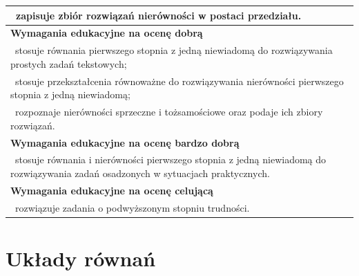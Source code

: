 \documentclass[12pt,a4paper]{article}
\begin{document}
\begin{longtable}{|p{16cm}|}
		\textbullet\ zapisuje zbiór rozwiązań nierówności w postaci przedziału. \\ \hline
		
		\textbf{Wymagania edukacyjne na ocenę dobrą} \\ \hline
		
		\textbullet\ stosuje równania pierwszego stopnia z jedną niewiadomą do rozwiązywania prostych zadań tekstowych; \\
		
		\textbullet\ stosuje przekształcenia równoważne do rozwiązywania nierówności pierwszego stopnia z jedną niewiadomą; \\
		
		\textbullet\ rozpoznaje nierówności sprzeczne i tożsamościowe oraz podaje ich zbiory rozwiązań. \\ \hline
		
		\textbf{Wymagania edukacyjne na ocenę bardzo dobrą} \\ \hline
		
		\textbullet\ stosuje równania i nierówności pierwszego stopnia z jedną niewiadomą do rozwiązywania zadań osadzonych w sytuacjach praktycznych. \\ \hline
		
		\textbf{Wymagania edukacyjne na ocenę celującą} \\ \hline
		
		\textbullet\ rozwiązuje zadania o podwyższonym stopniu trudności. \\ \hline
		
	\end{longtable}
	
	\section{Układy równań}
	
\end{document}
